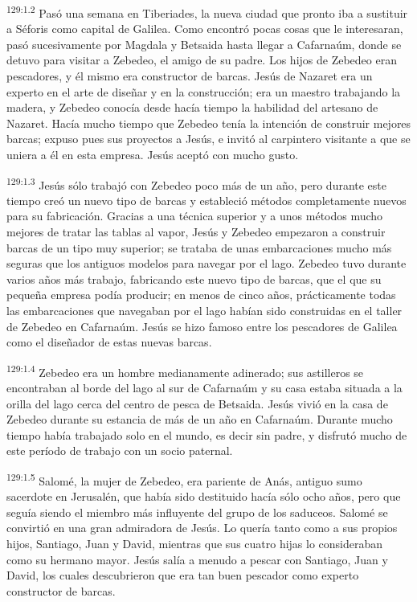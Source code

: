 \par 
\textsuperscript{129:1.2} Pasó una semana en Tiberiades, la nueva ciudad que pronto iba a sustituir a Séforis como capital de Galilea. Como encontró pocas cosas que le interesaran, pasó sucesivamente por Magdala y Betsaida hasta llegar a Cafarnaúm, donde se detuvo para visitar a Zebedeo, el amigo de su padre. Los hijos de Zebedeo eran pescadores, y él mismo era constructor de barcas. Jesús de Nazaret era un experto en el arte de diseñar y en la construcción; era un maestro trabajando la madera, y Zebedeo conocía desde hacía tiempo la habilidad del artesano de Nazaret. Hacía mucho tiempo que Zebedeo tenía la intención de construir mejores barcas; expuso pues sus proyectos a Jesús, e invitó al carpintero visitante a que se uniera a él en esta empresa. Jesús aceptó con mucho gusto.

\par 
\textsuperscript{129:1.3} Jesús sólo trabajó con Zebedeo poco más de un año, pero durante este tiempo creó un nuevo tipo de barcas y estableció métodos completamente nuevos para su fabricación. Gracias a una técnica superior y a unos métodos mucho mejores de tratar las tablas al vapor, Jesús y Zebedeo empezaron a construir barcas de un tipo muy superior; se trataba de unas embarcaciones mucho más seguras que los antiguos modelos para navegar por el lago. Zebedeo tuvo durante varios años más trabajo, fabricando este nuevo tipo de barcas, que el que su pequeña empresa podía producir; en menos de cinco años, prácticamente todas las embarcaciones que navegaban por el lago habían sido construidas en el taller de Zebedeo en Cafarnaúm. Jesús se hizo famoso entre los pescadores de Galilea como el diseñador de estas nuevas barcas.

\par 
\textsuperscript{129:1.4} Zebedeo era un hombre medianamente adinerado; sus astilleros se encontraban al borde del lago al sur de Cafarnaúm y su casa estaba situada a la orilla del lago cerca del centro de pesca de Betsaida. Jesús vivió en la casa de Zebedeo durante su estancia de más de un año en Cafarnaúm. Durante mucho tiempo había trabajado solo en el mundo, es decir sin padre, y disfrutó mucho de este período de trabajo con un socio paternal.

\par 
\textsuperscript{129:1.5} Salomé, la mujer de Zebedeo, era pariente de Anás, antiguo sumo sacerdote en Jerusalén, que había sido destituido hacía sólo ocho años, pero que seguía siendo el miembro más influyente del grupo de los saduceos. Salomé se convirtió en una gran admiradora de Jesús. Lo quería tanto como a sus propios hijos, Santiago, Juan y David, mientras que sus cuatro hijas lo consideraban como su hermano mayor. Jesús salía a menudo a pescar con Santiago, Juan y David, los cuales descubrieron que era tan buen pescador como experto constructor de barcas.

